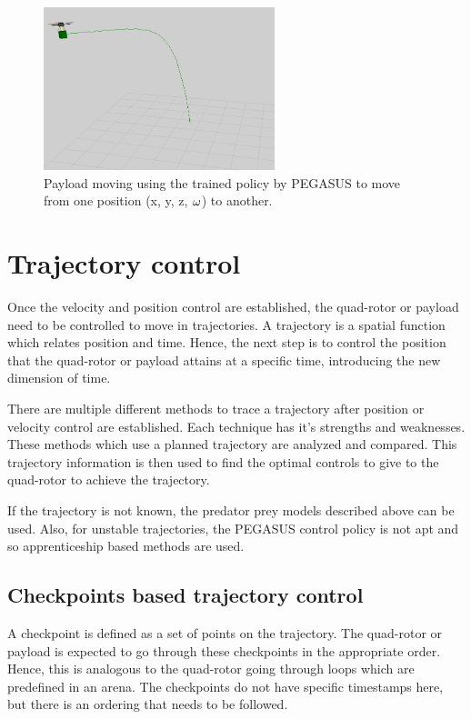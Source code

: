 \documentclass[hidelinks,BTech]{iitmdiss}
\begin{document}
\begin{figure}[H]
  \centering
    \includegraphics[width=0.6\textwidth]{payload_position_control.png}
    \caption{Payload moving using the trained policy by PEGASUS to move from one position (x, y, z, $\protect\omega$) to another.}
\end{figure}

\chapter{Trajectory control}

Once the velocity and position control are established, the quad-rotor or payload need to be controlled to move in trajectories. A trajectory is a spatial function which relates position and time. Hence, the next step is to control the position that the quad-rotor or payload attains at a specific time, introducing the new dimension of time.

There are multiple different methods to trace a trajectory after position or velocity control are established. Each technique has it's strengths and weaknesses. These methods which use a planned trajectory are analyzed and compared. This trajectory information is then used to find the optimal controls to give to the quad-rotor to achieve the trajectory.

If the trajectory is not known, the predator prey models described above can be used. Also, for unstable trajectories, the PEGASUS control policy is not apt and so apprenticeship based methods are used.

\section{Checkpoints based trajectory control}

A checkpoint is defined as a set of points on the trajectory. The quad-rotor or payload is expected to go through these checkpoints in the appropriate order. Hence, this is analogous to the quad-rotor going through loops which are predefined in an arena. The checkpoints do not have specific timestamps here, but there is an ordering that needs to be followed.
\end{document}
